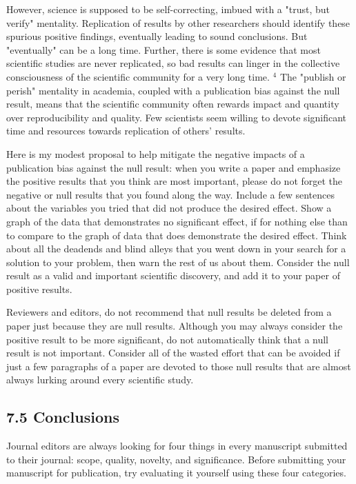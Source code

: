 However, science is supposed to be self-correcting, imbued with a "trust, but verify" mentality. Replication of results by other researchers should identify these spurious positive findings, eventually leading to sound conclusions. But "eventually" can be a long time. Further, there is some evidence that most scientific studies are never replicated, so bad results can linger in the collective consciousness of the scientific community for a very long time. ${ }^{4}$ The "publish or perish" mentality in academia, coupled with a publication bias against the null result, means that the scientific community often rewards impact and quantity over reproducibility and quality. Few scientists seem willing to devote significant time and resources towards replication of others' results.

Here is my modest proposal to help mitigate the negative impacts of a publication bias against the null result: when you write a paper and emphasize the positive results that you think are most important, please do not forget the negative or null results that you found along the way. Include a few sentences about the variables you tried that did not produce the desired effect. Show a graph of the data that demonstrates no significant effect, if for nothing else than to compare to the graph of data that does demonstrate the desired effect. Think about all the deadends and blind alleys that you went down in your search for a solution to your problem, then warn the rest of us about them. Consider the null result as a valid and important scientific discovery, and add it to your paper of positive results.

Reviewers and editors, do not recommend that null results be deleted from a paper just because they are null results. Although you may always consider the positive result to be more significant, do not automatically think that a null result is not important. Consider all of the wasted effort that can be avoided if just a few paragraphs of a paper are devoted to those null results that are almost always lurking around every scientific study.

\subsection*{7.5 Conclusions}
Journal editors are always looking for four things in every manuscript submitted to their journal: scope, quality, novelty, and significance. Before submitting your manuscript for publication, try evaluating it yourself using these four categories.

